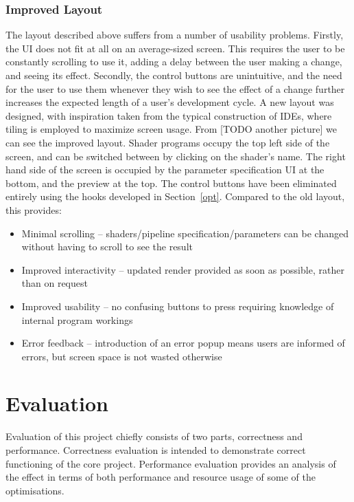 \documentclass[12pt,twoside,notitlepage]{report}
\begin{document}
\subsection{Improved Layout}
The layout described above suffers from a number of usability problems. Firstly, the UI does not fit at all on an average-sized screen. This requires the user to be constantly scrolling to use it, adding a delay between the user making a change, and seeing its effect. Secondly, the control buttons are unintuitive, and the need for the user to use them whenever they wish to see the effect of a change further increases the expected length of a user's development cycle. A new layout was designed, with inspiration taken from the typical construction of IDEs, where tiling is employed to maximize screen usage. From [TODO another picture] we can see the improved layout. Shader programs occupy the top left side of the screen, and can be switched between by clicking on the shader's name. The right hand side of the screen is occupied by the parameter specification UI at the bottom, and the preview at the top. The control buttons have been eliminated entirely using the hooks developed in Section~\ref{opt}. Compared to the old layout, this provides:
\begin{itemize}
\item Minimal scrolling -- shaders/pipeline specification/parameters can be changed without having to scroll to see the result
\item Improved interactivity -- updated render provided as soon as possible, rather than on request
\item Improved usability -- no confusing buttons to press requiring knowledge of internal program workings 
\item Error feedback -- introduction of an error popup means users are informed of errors, but screen space is not wasted otherwise
\end{itemize}
\cleardoublepage
\chapter{Evaluation}
Evaluation of this project chiefly consists of two parts, correctness and performance. Correctness evaluation is intended to demonstrate correct functioning of the core project. Performance evaluation provides an analysis of the effect in terms of both performance and resource usage of some of the optimisations.
\end{document}
